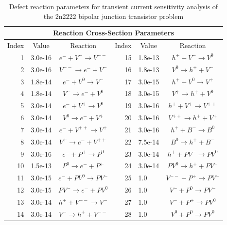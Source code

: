 \documentclass[pdf,ps2pdf,11pt]{SANDreport}
\begin{document}
{\bsinglespace
\begin{table}
\caption[Defect reaction parameters for transient current sensitivity
analysis]{\label{table:ParameterKey}
Defect reaction parameters for transient current sensitivity analysis of the
2n2222 bipolar junction transistor problem}
\begin{center}
\begin{tabular}{|r|l|c|r|l|c|}
\hline 
\multicolumn{6}{|c|}{Reaction Cross-Section Parameters} \\
\hline
\multicolumn{1}{|c|}{Index} & 
\multicolumn{1}{c|}{Value} & 
\multicolumn{1}{c|}{Reaction} & 
\multicolumn{1}{c|}{Index} & 
\multicolumn{1}{c|}{Value} & 
\multicolumn{1}{c|}{Reaction} \\ 
\hline\hline
1  & 3.0e-16 & $e^- + V^-\rightarrow V^{--}$  & 15 & 1.8e-13 & $h^+ + V^- \rightarrow V^0$     \\
2  & 3.0e-16 & $V^{--} \rightarrow e^- + V^-$ & 16 & 1.8e-13 & $V^0 \rightarrow h^+ + V^-$     \\
3  & 1.8e-14 & $e^- + V^0 \rightarrow V^-$    & 17 & 3.0e-15 & $h^+ + V^0 \rightarrow V^+$     \\
4  & 1.8e-14 & $V^- \rightarrow e^- + V^0$    & 18 & 3.0e-15 & $V^+ \rightarrow h^+ + V^0$     \\ 
5  & 3.0e-14 & $e^- + V^+ \rightarrow V^0$    & 19 & 3.0e-16 & $h^+ + V^+ \rightarrow V^{++}$  \\
6  & 3.0e-14 & $V^0 \rightarrow e^- + V^+$    & 20 & 3.0e-16 & $V^{++} \rightarrow h^+ + V^+$  \\
7  & 3.0e-14 & $e^- + V^{++} \rightarrow V^+$ & 21 & 3.0e-16 & $h^+ + B^- \rightarrow B^0$     \\
8  & 3.0e-14 & $V^+ \rightarrow e^- + V^{++}$ & 22 & 7.5e-14 & $B^0 \rightarrow h^+ + B^-$     \\
9  & 3.0e-16 & $e^- + P^+ \rightarrow P^0$    & 23 & 3.0e-14& $h^+ + PV^- \rightarrow PV^0$   \\
10 & 1.5e-13 & $P^0 \rightarrow e^- + P^+$    & 24 & 3.0e-14 & $PV^0 \rightarrow h^+ + PV^-$   \\
11 & 3.0e-15 & $e^- + PV^0 \rightarrow PV^-$  & 25 & 1.0 & $V^{--} + P^+ \rightarrow PV^-$ \\
12 & 3.0e-15 & $PV^- \rightarrow e^- + PV^0$  & 26 & 1.0 & $V^- + P^0 \rightarrow PV^-$    \\
13 & 3.0e-14 & $h^+ + V^{--} \rightarrow V^-$ & 27 & 1.0 & $V^- + P^+ \rightarrow PV^0$    \\
14 & 3.0e-14 & $V^- \rightarrow h^+ + V^{--}$ & 28 & 1.0 & $V^0 + P^0 \rightarrow PV^0$    \\

\end{tabular}
\end{center}
\end{table}}
\end{document}
